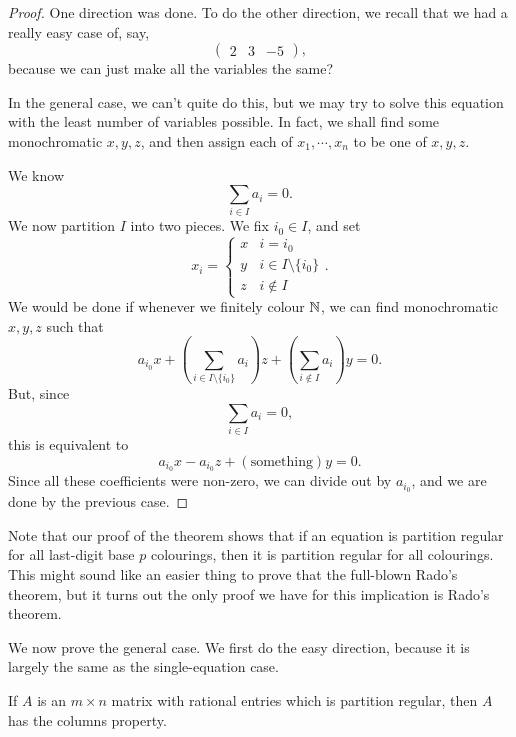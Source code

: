\documentclass[a4paper]{article}
\begin{document}
\begin{proof}
  One direction was done. To do the other direction, we recall that we had a really easy case of, say,
  \[
    \begin{pmatrix}
      2 & 3 & -5
    \end{pmatrix},
  \]
  because we can just make all the variables the same?

  In the general case, we can't quite do this, but we may try to solve this equation with the least number of variables possible. In fact, we shall find some monochromatic $x, y, z$, and then assign each of $x_1, \cdots, x_n$ to be one of $x, y, z$.

  We know
  \[
    \sum_{i \in I} a_i = 0.
  \]
  We now partition $I$ into two pieces. We fix $i_0 \in I$, and set
  \[
    x_i =
    \begin{cases}
      x & i = i_0\\
      y & i \in I \setminus \{i_0\}\\
      z & i \not\in I
    \end{cases}.
  \]
  We would be done if whenever we finitely colour $\mathbb{N}$, we can find monochromatic $x, y, z$ such that
  \[
    a_{i_0}x + \left(\sum_{i \in I \setminus \{i_0\}} a_i\right) z + \left(\sum_{i \not \in I} a_i\right) y = 0.
  \]
  But, since
  \[
    \sum_{i \in I} a_i = 0,
  \]
  this is equivalent to
  \[
    a_{i_0} x - a_{i_0} z + (\text{something}) y = 0.
  \]
  Since all these coefficients were non-zero, we can divide out by $a_{i_0}$, and we are done by the previous case.
\end{proof}

Note that our proof of the theorem shows that if an equation is partition regular for all last-digit base $p$ colourings, then it is partition regular for all colourings. This might sound like an easier thing to prove that the full-blown Rado's theorem, but it turns out the only proof we have for this implication is Rado's theorem.

We now prove the general case. We first do the easy direction, because it is largely the same as the single-equation case.

\begin{prop}
  If $A$ is an $m \times n$ matrix with rational entries which is partition regular, then $A$ has the columns property.
\end{prop}
\end{document}
